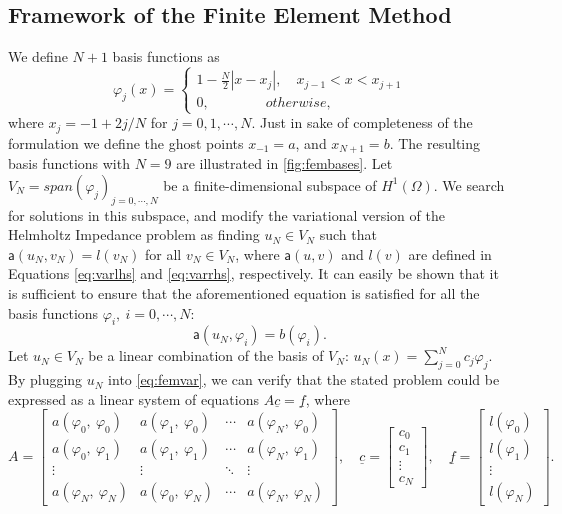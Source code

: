 \subsection{Framework of the Finite Element Method}\label{sec:femframework}
We define $N+1$ basis functions as
\begin{equation}
    \label{eq:fembasisfuncs}
    \varphi_j(x) = \left\{\begin{matrix}
        1 - \frac{N}{2}|x - x_j|, \quad x_{j-1} < x < x_{j+1}
        \\
        0, \qquad \qquad otherwise,
        \end{matrix}\right.
\end{equation}
where $x_j = -1 + 2j/N$ for $j = 0, 1, \cdots, N$. Just in sake of completeness of the formulation we define the ghost points $x_{-1} = a$, and $x_{N+1} = b$. The resulting basis functions with $N=9$ are illustrated in \autoref{fig:fembases}. Let $V_N = span(\varphi_j)_{j=0, \cdots, N}$ be a finite-dimensional subspace of $H^{1}(\Omega)$. We search for solutions in this subspace, and modify the variational version of the Helmholtz Impedance problem as finding $u_N \in V_N$ such that $\mathsf{a}(u_N,v_N) = l(v_N)$ for all $v_N \in V_N$, where $\mathsf{a}(u,v)$ and $l(v)$ are defined in Equations \eqref{eq:varlhs} and \eqref{eq:varrhs}, respectively. It can easily be shown that it is sufficient to ensure that the aforementioned equation is satisfied for all the basis functions $\varphi_i,\:i=0, \cdots, N$:
\begin{equation}
    \label{eq:femvar}
    \mathsf{a}(u_N,\varphi_i) = b(\varphi_i).
\end{equation}
Let $u_N \in V_N$ be a linear combination of the basis of $V_N$: $u_N(x) = \sum_{j=0}^{N}{c_j\varphi_j}$. By plugging $u_N$ into \eqref{eq:femvar}, we can verify that the stated problem could be expressed as a linear system of equations $A\underline{c}=\underline{f}$, where
\begin{equation}
    \label{eq:femcoeffs}
    A = \begin{bmatrix}
        a(\varphi_0,\:\varphi_0) & a(\varphi_1,\:\varphi_0) & \cdots & a(\varphi_N,\:\varphi_0) \\
        a(\varphi_0,\:\varphi_1) & a(\varphi_1,\:\varphi_1) & \cdots & a(\varphi_N,\:\varphi_1) \\
        \vdots & \vdots & \ddots & \vdots \\
        a(\varphi_N,\:\varphi_N) & a(\varphi_0,\:\varphi_N) & \cdots & a(\varphi_N,\:\varphi_N)
        \end{bmatrix},
        \quad
        \underline{c} = \begin{bmatrix}
        c_0\\
        c_1\\
        \vdots\\
        c_N
        \end{bmatrix},
        \quad
        \underline{f} = \begin{bmatrix}
        l(\varphi_0)\\
        l(\varphi_1)\\
        \vdots\\
        l(\varphi_N)
        \end{bmatrix}.
\end{equation}
